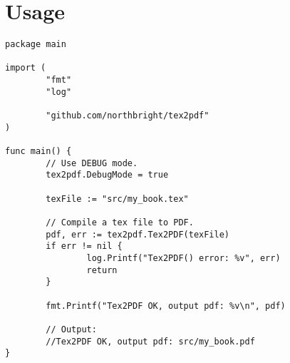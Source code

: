 \section{Usage}

\begin{verbatim}
package main

import (
        "fmt"
        "log"

        "github.com/northbright/tex2pdf"
)

func main() {
        // Use DEBUG mode.
        tex2pdf.DebugMode = true

        texFile := "src/my_book.tex"

        // Compile a tex file to PDF.
        pdf, err := tex2pdf.Tex2PDF(texFile)
        if err != nil {
                log.Printf("Tex2PDF() error: %v", err)
                return
        }

        fmt.Printf("Tex2PDF OK, output pdf: %v\n", pdf)

        // Output:
        //Tex2PDF OK, output pdf: src/my_book.pdf
}
\end{verbatim}
